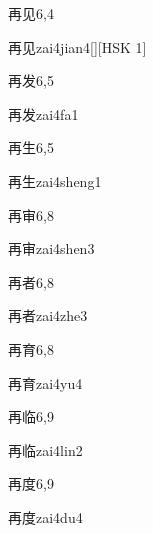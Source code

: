 \begin{entry}{再见}{6,4}
  \begin{phonetics}{再见}{zai4jian4}[][HSK 1]
  \end{phonetics}
\end{entry}

\begin{entry}{再发}{6,5}
  \begin{phonetics}{再发}{zai4fa1}
  \end{phonetics}
\end{entry}

\begin{entry}{再生}{6,5}
  \begin{phonetics}{再生}{zai4sheng1}
  \end{phonetics}
\end{entry}

\begin{entry}{再审}{6,8}
  \begin{phonetics}{再审}{zai4shen3}
  \end{phonetics}
\end{entry}

\begin{entry}{再者}{6,8}
  \begin{phonetics}{再者}{zai4zhe3}
  \end{phonetics}
\end{entry}

\begin{entry}{再育}{6,8}
  \begin{phonetics}{再育}{zai4yu4}
  \end{phonetics}
\end{entry}

\begin{entry}{再临}{6,9}
  \begin{phonetics}{再临}{zai4lin2}
  \end{phonetics}
\end{entry}

\begin{entry}{再度}{6,9}
  \begin{phonetics}{再度}{zai4du4}
  \end{phonetics}
\end{entry}

